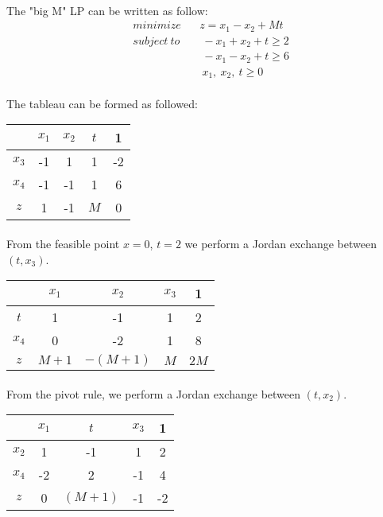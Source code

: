 \paragraph{}
The "big M" LP can be written as follow:
\begin{align*}
& minimize \quad \ \ \  z=x_1-x_2+Mt\\
& subject \ to \qquad -x_1 + x_2 + t \geq 2\\
&\qquad \qquad \quad \quad  \ -x_1 - x_2 + t \geq 6 \\
&\qquad \qquad \quad \quad  \ x_1, \ x_2, \ t \geq 0 
\end{align*}
\paragraph{}
The tableau can be formed as followed:
\begin{center}
	\begin{tabular}{ c | c  c  c | c }
		\      & $x_1$ & $x_2$ &   $t$ &   1 \\ \hline
		$x_3$  &    -1 &     1 &     1 &  -2 \\ 
		$x_4$  &    -1 &    -1 &     1 &   6 \\ \hline
		$z$    &     1 &    -1 &   $M$ &   0 \\
	\end{tabular}
\end{center}
\paragraph{}
From the feasible point $x=0$, $t=2$ we perform a Jordan exchange between $(t, x_3)$.
\begin{center}
	\begin{tabular}{ c | c  c  c | c }
		\      & $x_1$ &    $x_2$ & $x_3$ &    1 \\ \hline
		$t$    &     1 &       -1 &     1 &    2 \\ 
		$x_4$  &     0 &       -2 &     1 &    8 \\ \hline
		$z$    & $M+1$ & $-(M+1)$ &   $M$ & $2M$ \\
	\end{tabular}
\end{center}
\paragraph{}
From the pivot rule, we perform a Jordan exchange between $(t, x_2)$.
\begin{center}
	\begin{tabular}{ c | c  c  c | c }
		\      & $x_1$ &      $t$ & $x_3$ &   1 \\ \hline
		$x_2$  &     1 &       -1 &     1 &   2 \\ 
		$x_4$  &    -2 &        2 &    -1 &   4 \\ \hline
		$z$    &     0 &  $(M+1)$ &    -1 &  -2 \\
	\end{tabular}
\end{center}
